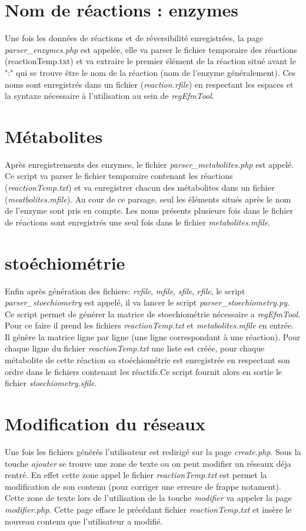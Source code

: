 \section{Nom de réactions : enzymes}
Une fois les données de réactions et de réversibilité enregistrées, la page \emph{parser\_enzymes.php} est appelée, elle va parser le fichier temporaire des réactions  (reactionTemp.txt) et va extraire le premier élément de la réaction situé avant le ":" qui se trouve être le nom de la réaction (nom de l'enzyme généralement).
Ces noms sont enregistrés dans un fichier (\emph{reaction.rfile}) en respectant les espaces et la syntaxe nécessaire à l'utilisation au sein de \emph{regEfmTool}.

\section{Métabolites}
Après enregistrements des enzymes, le fichier \emph{parser\_metabolites.php} est appelé. Ce script va parser le fichier temporaire contenant les réactions (\emph{reactionTemp.txt}) et va enregistrer chacun des métabolites dans un fichier (\emph{meatbolites.mfile}). Au cour de ce parsage, seul les éléments situés après le nom de l'enzyme sont pris en compte. Les noms présents plusieurs fois dans le fichier de réactions sont enregistrés une seul fois dans le fichier \emph{metabolites.mfile}.

\section{stoéchiométrie}
Enfin après génération des fichiers: \emph{rvfile}, \emph{mfile}, \emph{sfile}, \emph{rfile}, le script \emph{parser\_stoechiometry} est appelé, il va lancer le script \emph{parser\_stoechiometry.py}. Ce script permet de générer la matrice de stoechiométrie nécessaire a \emph{regEfmTool}. Pour ce faire il prend les fichiers \emph{reactionTemp.txt} et \emph{metabolites.mfile} en entrée. Il génère la matrice ligne par ligne (une ligne correspondant à une réaction). Pour chaque ligne du fichier \emph{reactionTemp.txt} une liste est créée, pour chaque métabolite de cette réaction sa stoéchiométrie est enregistrée en respectant son ordre dans le fichiers contenant les réactifs.Ce script fournit alors en sortie le fichier \emph{stoechiometry.sfile}.

\section{Modification du réseaux}
Une fois les fichiers générés l'utilisateur est redirigé sur la page \emph{create.php}.
Sous la touche \emph{ajouter} se trouve une zone de texte ou on peut modifier un réseaux déja rentré. En effet cette zone appel le fichier \emph{reactionTemp.txt} est permet la modification de son contenu (pour corriger une erreure de frappe notament). Cette zone de texte lors de l'utilisation de la touche \emph{modifier} va appeler la page \emph{modifier.php}. Cette page efface le précédant fichier \emph{reactionTemp.txt} et insère le nouveau contenu que l'utilisateur a modifié.



